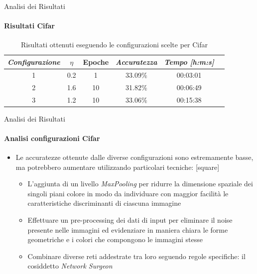 \documentclass[
 ]{beamer}
\begin{document}
\begin{frame}{Analisi dei Risultati}
    \framesubtitle{Risultati Cifar}

        \begin{table}
            \centering
            \renewcommand\arraystretch{1.3}
            \small
            \begin{tabular}{| c | c | c | c | c | c |}
                \hline
                \emph{Configurazione} & $\eta$ & Epoche & \emph{Accuratezza} & \emph{Tempo [h:m:s]} \\
                \hline
                1 & 0.2 &  1 & 33.09\% & 00:03:01 \\
                2 & 1.6 & 10 & 31.82\% & 00:06:49 \\
                3 & 1.2 & 10 & 33.06\% & 00:15:38 \\                
                \hline
            \end{tabular}
            \caption            
    {Risultati ottenuti eseguendo le configurazioni scelte per Cifar \endtabular}          
        \end{table}    
\end{frame}

\begin{frame}{Analisi dei Risultati}
    \framesubtitle{Analisi configurazioni Cifar}
    \smallskip
    \begin{itemize} [<+->]
        \setlength\itemsep{2em}
        \item \large Le accuratezze ottenute dalle diverse configurazioni sono estremamente basse, ma potrebbero aumentare utilizzando particolari tecniche:
        [square] 
        \begin{itemize} 
        \setlength\itemsep{2em}
            \item \large L'aggiunta di un livello \emph{MaxPooling} per ridurre la dimensione spaziale dei singoli piani colore in modo da individuare con maggior facilità le caratteristiche discriminanti di ciascuna immagine
            \item \large Effettuare un pre-processing dei dati di input per eliminare il noise presente nelle immagini ed evidenziare in maniera chiara le forme geometriche e i colori che compongono le immagini stesse
            \item \large Combinare diverse reti addestrate tra loro seguendo regole specifiche: il cosiddetto \emph{Network Surgeon}  
        \end{itemize}
    \end{itemize}     
\end{frame}
\end{document}
